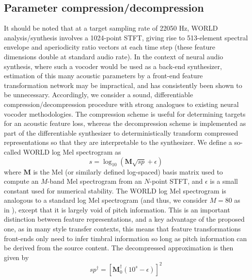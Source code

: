 \documentclass{article}
\begin{document}
\begin{sloppy}
\subsection{Parameter compression/decompression}
\label{ssec:compression}
It should be noted that at a target sampling rate of 22050 Hz, WORLD analysis/synthesis involves a 1024-point STFT, giving rise to 513-element spectral envelope and aperiodicity ratio vectors at each time step (these feature dimensions double at standard audio rate). In the context of neural audio synthesis, where such a vocoder would be used as a back-end synthesizer, estimation of this many acoustic parameters by a front-end feature transformation network may be impractical, and has consistently been shown to be unnecessary.  Accordingly, we consider a sound, differentiable compression/decompression procedure with strong analogues to existing neural vocoder methodologies.  The compression scheme is useful for determining targets for an acoustic feature loss, whereas the decompression scheme is implemented as part of the differentiable synthesizer to deterministically transform compressed representations so that they are interpretable to the synthesizer.  We define a so-called WORLD log Mel spectrogram as
\begin{equation}
\label{eqn:world_mels_compress}
s = \log_{10}(\mathbf{M}\sqrt{sp}+\epsilon)
\end{equation}
where $\mathbf{M}$ is the Mel (or similarly defined log-spaced) basis matrix used to compute an $M$-band Mel spectrogram from an $N$-point STFT, and $\epsilon$ is a small constant used for numerical stability.  The WORLD log Mel spectrogram is analogous to a standard log Mel spectrogram (and thus, we consider $M=80$ as in \cite{Tacotron}), except that it is largely void of pitch information.  This is an important distinction between feature representations, and a key advantage of the proposed one, as in many style transfer contexts, this means that feature transformations front-ends only need to infer timbral information so long as pitch information can be derived from the source content.  The decompressed approximation is then given by
\begin{equation}
\label{eqn:world_mels_decompress}
sp^\dagger = \left[\mathbf{M}^\dagger_0(10^s-\epsilon)\right]^2
\end{equation}

\end{sloppy}
\end{document}
